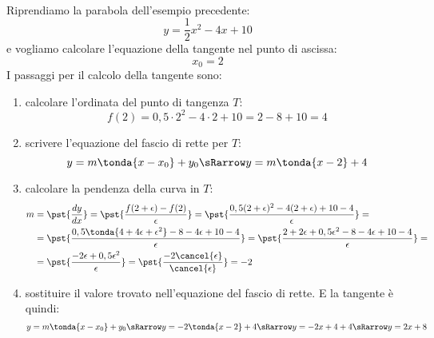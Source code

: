\begin{esempio}
{~}

\begin{minipage}{.59\textwidth}
Riprendiamo la parabola dell'esempio precedente:
\[y=\dfrac{1}{2}x^2-4x+10\]
e vogliamo calcolare l'equazione della tangente nel punto di ascissa: 
\[x_0=2\]
I passaggi per il calcolo della tangente sono:
\begin{enumerate}[noitemsep, wide, labelwidth=!,, labelindent=0pt]
\item calcolare l'ordinata del punto di tangenza \(T\):
\[f(2)=0,5 \cdot 2^2 -4 \cdot 2 +10=2-8+10=4\]
\end{enumerate}
\end{minipage}
\hfill
\begin{minipage}{.39\textwidth}
\begin{center}\ipertangente\end{center}
\end{minipage}

\begin{enumerate}[noitemsep]
  \setcounter{enumi}{1}
 \item scrivere l'equazione del fascio di rette per \(T\):
\[y=m \tonda{x-x_0}+y_0 \sRarrow y=m \tonda{x-2}+4\]
 \item calcolare la pendenza della curva in \(T\):
\begin{align*}
m&=\pst{\dfrac{d y}{d x}}=
\pst{\dfrac{f(2+\epsilon)-f(2)}{\epsilon}}=
\pst{\dfrac{0,5(2+\epsilon)^2-4(2+\epsilon)+10-4}{\epsilon}}=\\
 &=\pst{\dfrac{0,5\tonda{4+4\epsilon+\epsilon^2}-8-4\epsilon+10-4}
              {\epsilon}}
 =\pst{\dfrac{2+2\epsilon+0,5\epsilon^2-8-4\epsilon+10-4}
             {\epsilon}}=\\
 &=\pst{\dfrac{-2\epsilon+0,5\epsilon^2}{\epsilon}}=
   \pst{\dfrac{-2\cancel{\epsilon}}{\cancel{\epsilon}}}=-2
\end{align*}
 \item sostituire il valore trovato nell'equazione del fascio di rette.
E la tangente è quindi:
\[y=m \tonda{x-x_0}+y_0 \sRarrow y=-2 \tonda{x-2}+4 \sRarrow 
y=-2x+4+4 \sRarrow y=2x+8\]
\end{enumerate}

\end{esempio}

